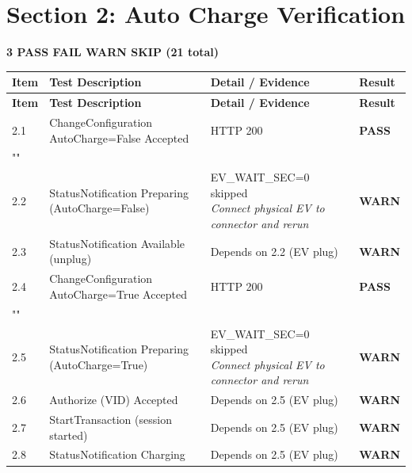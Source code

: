 \documentclass[10pt, a4paper]{article}
\begin{document}
\newpage
\section{Section 2: Auto Charge Verification}
\textbf{3 PASS  FAIL  WARN  SKIP \quad (21 total)}

\renewcommand{\arraystretch}{1.35}
\begin{longtable}{|L{1cm}|L{5.5cm}|M{7cm}|C{1.8cm}|}
\hline
{}
\textbf{Item} & \small\textbf{Test Description} & \small\textbf{Detail / Evidence} & \small\textbf{Result} \\
\hline
\endfirsthead
\hline
{}
\textbf{Item} & \small\textbf{Test Description} & \small\textbf{Detail / Evidence} & \small\textbf{Result} \\
\hline
\endhead
\hline
\endfoot
\small 2.1 & \small ChangeConfiguration AutoCharge=False  Accepted & HTTP 200 & \textcolor{passgreen}{\textbf{PASS}} \\
\hline
{} \\
\hline
\small 2.2 & \small StatusNotification Preparing (AutoCharge=False) & EV\_WAIT\_SEC=0  skipped{\newline\normalfont\footnotesize\itshape Connect physical EV to connector and rerun} & \textcolor{warnorange}{\textbf{WARN}} \\
\hline
\small 2.3 & \small StatusNotification Available (unplug) & Depends on 2.2 (EV plug) & \textcolor{warnorange}{\textbf{WARN}} \\
\hline
\small 2.4 & \small ChangeConfiguration AutoCharge=True  Accepted & HTTP 200 & \textcolor{passgreen}{\textbf{PASS}} \\
\hline
{} \\
\hline
\small 2.5 & \small StatusNotification Preparing (AutoCharge=True) & EV\_WAIT\_SEC=0  skipped{\newline\normalfont\footnotesize\itshape Connect physical EV to connector and rerun} & \textcolor{warnorange}{\textbf{WARN}} \\
\hline
\small 2.6 & \small Authorize (VID)  Accepted & Depends on 2.5 (EV plug) & \textcolor{warnorange}{\textbf{WARN}} \\
\hline
\small 2.7 & \small StartTransaction (session started) & Depends on 2.5 (EV plug) & \textcolor{warnorange}{\textbf{WARN}} \\
\hline
\small 2.8 & \small StatusNotification Charging & Depends on 2.5 (EV plug) & \textcolor{warnorange}{\textbf{WARN}} \\

\end{longtable}
\end{document}
